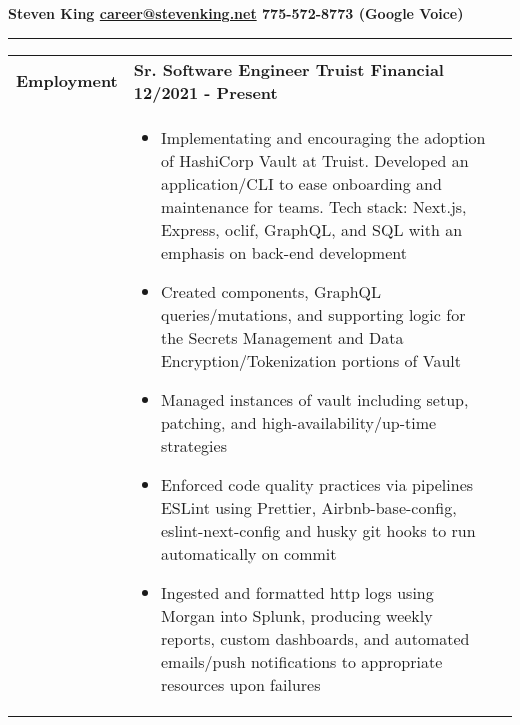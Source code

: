 \documentclass[final]{letter}
\begin{document}
	\begin{center}
		\bf\large {\fontsize{34}{12}\selectfont Steven King} \hfill \href{mailto:career@stevenking.net}{career@stevenking.net} \hfill 775-572-8773 (Google Voice) 
	\end{center}
	
	\rule{\textwidth}{1pt}	

	\begin{tabularx}{\linewidth}{
		>{\raggedright\bf\Large} p{8.5em}X
		>{}X
	} 
		Employment & \quad\large\bf{Sr. Software Engineer \hfill {Truist Financial} \hfill 12/2021 - Present} \\
		& \begin{itemize}[topsep=0pt,noitemsep]
			\item Implementating and encouraging the adoption of HashiCorp Vault at Truist. Developed an application/CLI to ease onboarding and maintenance for teams. Tech stack: Next.js, Express, oclif, GraphQL, and SQL with an emphasis on back-end development
			\item Created components, GraphQL queries/mutations, and supporting logic for the Secrets Management and Data Encryption/Tokenization portions of Vault
			\item Managed instances of vault including setup, patching, and high-availability/up-time strategies
			\item Enforced code quality practices via pipelines ESLint using Prettier, Airbnb-base-config, eslint-next-config and husky git hooks to run automatically on commit
			\item Ingested and formatted http logs using Morgan into Splunk, producing weekly reports, custom dashboards, and automated emails/push notifications to appropriate resources upon failures
		\end{itemize} \\
		

\end{tabularx}
\end{document}

